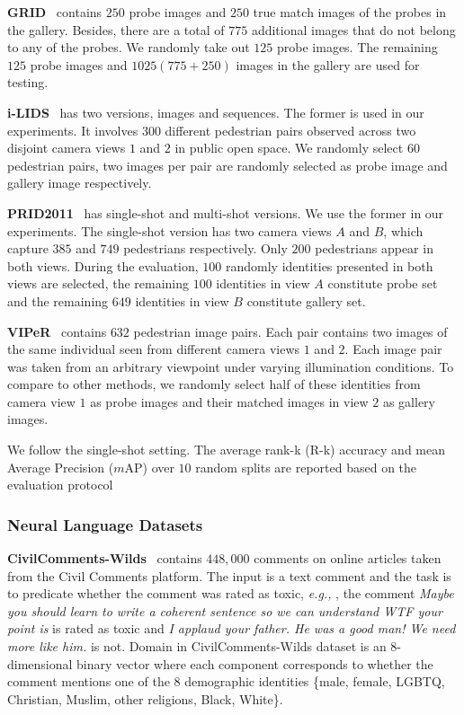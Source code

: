 \documentclass{article} \usepackage{iclr2023_conference,times}
\newcommand{\eg}[0]{\textit{e.g., }}
\begin{document}
\textbf{GRID}~\citep{grid} contains $250$ probe images and $250$ true match images of the probes in the gallery. Besides, there are a total of $775$ additional images that do not belong to any of the probes. We randomly take out $125$ probe images. The remaining $125$ probe images and $1025(775+250)$ images in the gallery are used for testing.

\textbf{i-LIDS}~\citep{ilids} has two versions, images and sequences. The former is used in our experiments. It involves $300$ different pedestrian pairs observed across two disjoint camera views $1$ and $2$ in public open space. We randomly select $60$ pedestrian pairs, two images per pair are randomly selected as probe image and gallery image respectively.

\textbf{PRID2011}~\citep{prid} has single-shot and multi-shot versions. We use the former in our experiments. The single-shot version has two camera views $A$ and $B$, which capture $385$ and $749$ pedestrians respectively. Only $200$ pedestrians appear in both views.  During the evaluation, $100$ randomly identities presented in both views are selected, the remaining $100$ identities in view $A$ constitute probe set and the remaining $649$ identities in view $B$ constitute gallery set.

\textbf{VIPeR}~\citep{viper} contains $632$ pedestrian image pairs. Each pair contains two images of the same individual seen from different camera views $1$ and $2$.  Each image pair was taken from an arbitrary viewpoint under varying illumination conditions. To compare to other methods, we randomly select half of these identities from camera view $1$ as probe images and their matched images in view $2$ as gallery images.

We follow the single-shot setting. The average rank-k (R-k) accuracy and mean Average Precision ($m$AP) over $10$ random splits are reported based on the evaluation protocol

\subsubsection{Neural Language Datasets}
 
\textbf{CivilComments-Wilds}~\citep{koh2021wilds} contains $448,000$ comments on online articles taken from the Civil Comments platform. The input is a text comment and the task is to predicate whether the comment was rated as toxic, \eg, the comment \textit{Maybe you should learn to write a coherent sentence so we can understand WTF your point is} is rated as toxic and \textit{I applaud your father. He was a good man! We need more like him.} is not. Domain in CivilComments-Wilds dataset is an 8-dimensional binary vector where each component corresponds to whether the comment mentions one of the 8 demographic identities \{male, female, LGBTQ, Christian, Muslim, other religions, Black, White\}. 
 
\end{document}
